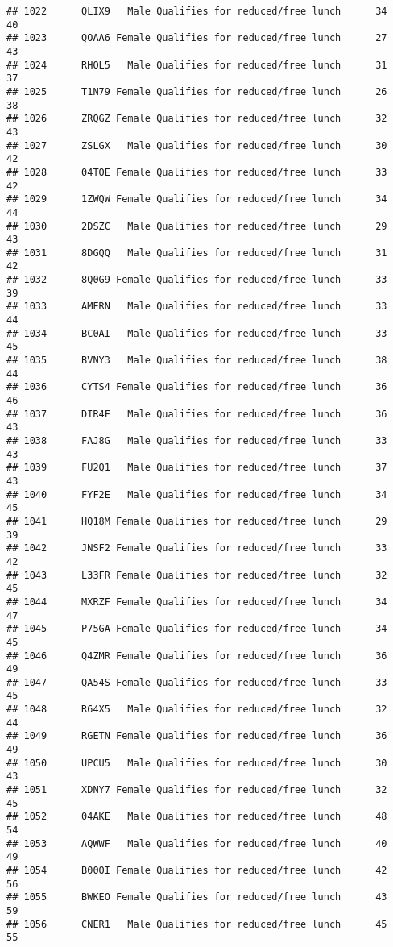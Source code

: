 \documentclass[
]{article}
\begin{document}
\begin{verbatim}
## 1022      QLIX9   Male Qualifies for reduced/free lunch      34       40
## 1023      QOAA6 Female Qualifies for reduced/free lunch      27       43
## 1024      RHOL5   Male Qualifies for reduced/free lunch      31       37
## 1025      T1N79 Female Qualifies for reduced/free lunch      26       38
## 1026      ZRQGZ Female Qualifies for reduced/free lunch      32       43
## 1027      ZSLGX   Male Qualifies for reduced/free lunch      30       42
## 1028      04TOE Female Qualifies for reduced/free lunch      33       42
## 1029      1ZWQW Female Qualifies for reduced/free lunch      34       44
## 1030      2DSZC   Male Qualifies for reduced/free lunch      29       43
## 1031      8DGQQ   Male Qualifies for reduced/free lunch      31       42
## 1032      8Q0G9 Female Qualifies for reduced/free lunch      33       39
## 1033      AMERN   Male Qualifies for reduced/free lunch      33       44
## 1034      BC0AI   Male Qualifies for reduced/free lunch      33       45
## 1035      BVNY3   Male Qualifies for reduced/free lunch      38       44
## 1036      CYTS4 Female Qualifies for reduced/free lunch      36       46
## 1037      DIR4F   Male Qualifies for reduced/free lunch      36       43
## 1038      FAJ8G   Male Qualifies for reduced/free lunch      33       43
## 1039      FU2Q1   Male Qualifies for reduced/free lunch      37       43
## 1040      FYF2E   Male Qualifies for reduced/free lunch      34       45
## 1041      HQ18M Female Qualifies for reduced/free lunch      29       39
## 1042      JNSF2 Female Qualifies for reduced/free lunch      33       42
## 1043      L33FR Female Qualifies for reduced/free lunch      32       45
## 1044      MXRZF Female Qualifies for reduced/free lunch      34       47
## 1045      P75GA Female Qualifies for reduced/free lunch      34       45
## 1046      Q4ZMR Female Qualifies for reduced/free lunch      36       49
## 1047      QA54S Female Qualifies for reduced/free lunch      33       45
## 1048      R64X5   Male Qualifies for reduced/free lunch      32       44
## 1049      RGETN Female Qualifies for reduced/free lunch      36       49
## 1050      UPCU5   Male Qualifies for reduced/free lunch      30       43
## 1051      XDNY7 Female Qualifies for reduced/free lunch      32       45
## 1052      04AKE   Male Qualifies for reduced/free lunch      48       54
## 1053      AQWWF   Male Qualifies for reduced/free lunch      40       49
## 1054      B00OI Female Qualifies for reduced/free lunch      42       56
## 1055      BWKEO Female Qualifies for reduced/free lunch      43       59
## 1056      CNER1   Male Qualifies for reduced/free lunch      45       55

\end{verbatim}
\end{document}
